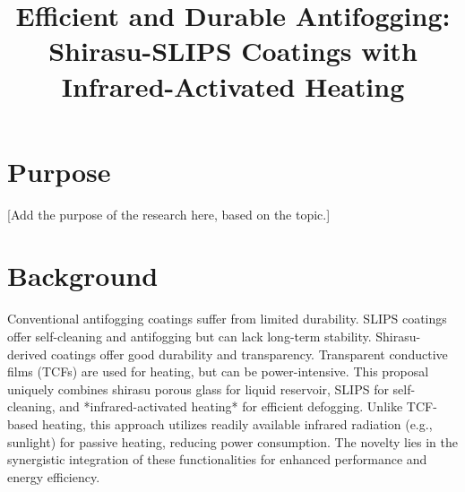 \documentclass{article}
\title{Efficient and Durable Antifogging: Shirasu-SLIPS Coatings with Infrared-Activated Heating}
\author{}
\date{}
\begin{document}
\maketitle
\section{Purpose}
[Add the purpose of the research here, based on the topic.]

\section{Background}
Conventional antifogging coatings suffer from limited durability. SLIPS coatings offer self-cleaning and antifogging but can lack long-term stability. Shirasu-derived coatings offer good durability and transparency. Transparent conductive films (TCFs) are used for heating, but can be power-intensive. This proposal uniquely combines shirasu porous glass for liquid reservoir, SLIPS for self-cleaning, and *infrared-activated heating* for efficient defogging. Unlike TCF-based heating, this approach utilizes readily available infrared radiation (e.g., sunlight) for passive heating, reducing power consumption. The novelty lies in the synergistic integration of these functionalities for enhanced performance and energy efficiency.
\end{document}
